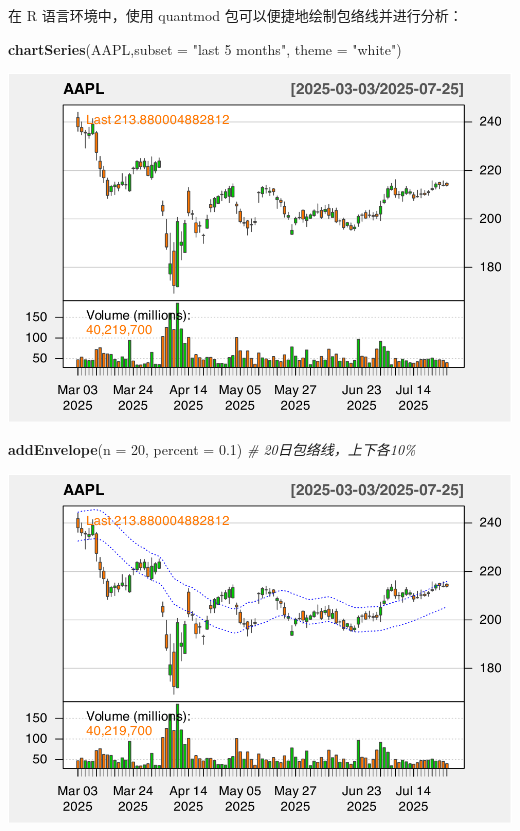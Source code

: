 \documentclass[]{ctexbook}
\newenvironment{Shaded}{\begin{snugshade}}{\end{snugshade}}
\newcommand{\AttributeTok}[1]{\textcolor[rgb]{0.13,0.29,0.53}{#1}}
\newcommand{\CommentTok}[1]{\textcolor[rgb]{0.56,0.35,0.01}{\textit{#1}}}
\newcommand{\DecValTok}[1]{\textcolor[rgb]{0.00,0.00,0.81}{#1}}
\newcommand{\FloatTok}[1]{\textcolor[rgb]{0.00,0.00,0.81}{#1}}
\newcommand{\FunctionTok}[1]{\textcolor[rgb]{0.13,0.29,0.53}{\textbf{#1}}}
\newcommand{\NormalTok}[1]{#1}
\newcommand{\StringTok}[1]{\textcolor[rgb]{0.31,0.60,0.02}{#1}}
\begin{document}
在 R 语言环境中，使用 quantmod 包可以便捷地绘制包络线并进行分析：

\begin{Shaded}
\begin{Highlighting}[]
\FunctionTok{chartSeries}\NormalTok{(AAPL,}\AttributeTok{subset =} \StringTok{"last 5 months"}\NormalTok{, }\AttributeTok{theme =} \StringTok{"white"}\NormalTok{)}
\end{Highlighting}
\end{Shaded}

\includegraphics[width=0.9\linewidth]{QuantmodHandbook_files/figure-latex/envol-1}

\begin{Shaded}
\begin{Highlighting}[]
\FunctionTok{addEnvelope}\NormalTok{(}\AttributeTok{n =} \DecValTok{20}\NormalTok{, }\AttributeTok{percent =} \FloatTok{0.1}\NormalTok{)  }\CommentTok{\# 20日包络线，上下各10\%}
\end{Highlighting}
\end{Shaded}

\includegraphics[width=0.9\linewidth]{QuantmodHandbook_files/figure-latex/envol-2}
\end{document}
